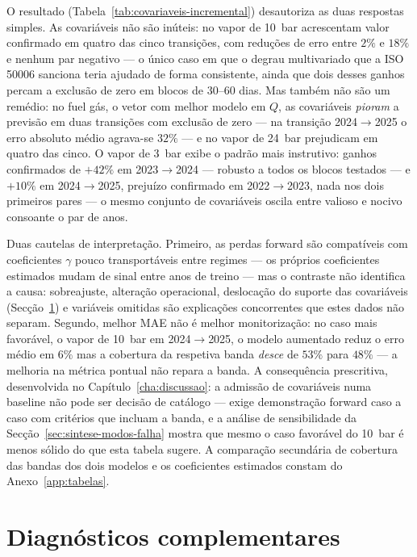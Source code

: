 O resultado (Tabela~\ref{tab:covariaveis-incremental}) desautoriza as duas respostas
simples. As covariáveis não são inúteis: no vapor de 10~bar acrescentam valor
confirmado em quatro das cinco transições, com reduções de erro entre $2\%$ e
$18\%$ e nenhum par negativo --- o único caso em que o degrau multivariado
que a ISO 50006 sanciona teria ajudado de forma consistente, ainda que dois
desses ganhos percam a exclusão de zero em blocos de 30--60 dias. Mas também
não são um remédio: no fuel gás, o vetor com melhor modelo em $Q$, as
covariáveis \emph{pioram} a previsão em duas transições com exclusão de zero
--- na transição 2024${\to}$2025 o erro absoluto médio agrava-se $32\%$ --- e
no vapor de 24~bar prejudicam em quatro das cinco. O vapor de 3~bar exibe o
padrão mais instrutivo: ganhos confirmados de $+42\%$ em 2023${\to}$2024 ---
robusto a todos os blocos testados --- e $+10\%$ em 2024${\to}$2025, prejuízo
confirmado em 2022${\to}$2023, nada nos dois primeiros pares --- o mesmo
conjunto de covariáveis oscila entre valioso e nocivo consoante o par de
anos.

Duas cautelas de interpretação. Primeiro, as perdas forward são compatíveis
com coeficientes $\gamma$ pouco transportáveis entre regimes --- os próprios
coeficientes estimados mudam de sinal entre anos de treino --- mas o contraste
não identifica a causa: sobreajuste, alteração operacional, deslocação do
suporte das covariáveis (Secção~\ref{sec:diagnosticos-desc}) e variáveis
omitidas são explicações concorrentes que estes dados não separam. Segundo,
melhor MAE não é melhor monitorização: no caso mais favorável, o vapor de
10~bar em 2024${\to}$2025, o modelo aumentado reduz o erro médio em $6\%$ mas
a cobertura da respetiva banda \emph{desce} de $53\%$ para $48\%$ --- a
melhoria na métrica pontual não repara a banda. A consequência prescritiva,
desenvolvida no Capítulo~\ref{cha:discussao}: a admissão de covariáveis numa
baseline não pode ser decisão de catálogo --- exige demonstração forward caso
a caso com critérios que incluam a banda, e a análise de sensibilidade da
Secção~\ref{sec:sintese-modos-falha} mostra que mesmo o caso favorável do
10~bar é menos sólido do que esta tabela sugere. A comparação secundária de
cobertura das bandas dos dois modelos e os coeficientes estimados constam do
Anexo~\ref{app:tabelas}.


\section{Diagnósticos complementares}
\label{sec:diagnosticos-desc}

